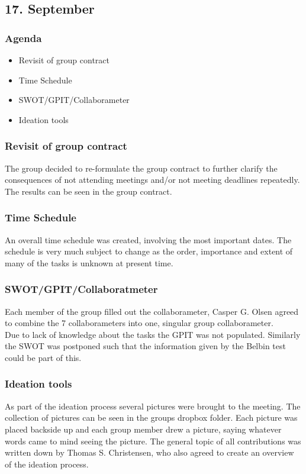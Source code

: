 \subsection{17. September}

\subsubsection{Agenda}
\begin{itemize}
	\item Revisit of group contract
	\item Time Schedule
	\item SWOT/GPIT/Collaborameter
	\item Ideation tools	
\end{itemize}
\subsubsection{Revisit of group contract}
The group decided to re-formulate the group contract to further clarify the consequences of not attending meetings and/or not meeting deadlines repeatedly. The results can be seen in the group contract.
\subsubsection{Time Schedule}
An overall time schedule was created, involving the most important dates. The schedule is very much subject to change as the order, importance and extent of many of the tasks is unknown at present time.
\subsubsection{SWOT/GPIT/Collaboratmeter}
Each member of the group filled out the collaborameter, Casper G. Olsen agreed to combine the 7 collaborameters into one, singular group collaborameter.\\
Due to lack of knowledge about the tasks the GPIT was not populated. Similarly the SWOT was postponed such that the information given by the Belbin test could be part of this.
\subsubsection{Ideation tools}
As part of the ideation process several pictures were brought to the meeting. The collection of pictures can be seen in the groups dropbox folder. Each picture was placed backside up and each group member drew a picture, saying whatever words came to mind seeing the picture. The general topic of all contributions was written down by Thomas S. Christensen, who also agreed to create an overview of the ideation process.